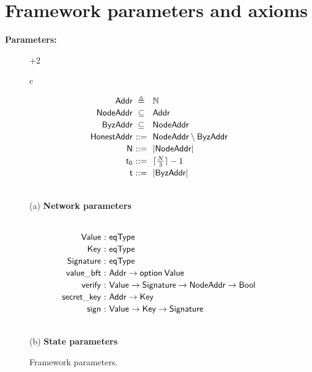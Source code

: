 \documentclass{article}
\begin{document}
\section{Framework parameters and axioms}

\textbf{Parameters:}

{
\begin{figure}[h]
\begin{varwidth}{\dimexpr\textwidth+2\fboxrule\relax}
\centering
{\small{
\begin{tabular}{c}
\begin{minipage}{0.435\linewidth}
{\small{
\[
\begin{array}{r@{\ }c@{\ \ }l}
  \Addr & \eqdef & \Nat \\[2pt]
   \NodeAddr & \subseteq & \Addr \\[2pt]
   \ByzAddr &  \subseteq &  \NodeAddr \\[2pt]
   \mathsf{HonestAddr} & ::= & \NodeAddr \setminus \ByzAddr \\[2pt]
  \N & ::= &  | \NodeAddr | \\[2pt]
  \tZero & ::= & \lceil \frac{N}{3} \rceil - 1 \\[2pt]
  \tN & ::= & | \ByzAddr |
\end{array}
\]
}}
\end{minipage}
\\[3pt]
\small{(a) {\textbf{Network parameters}}}
\\[4pt]
\\[-8pt]
\begin{minipage}{0.43\linewidth}
{\small{
\[
\begin{array}{r@{\ }c@{\ }l}
  \Value & : & \eqType \\[2pt]
  \mathsf{Key} & : & \eqType \\[2pt]
  \mathsf{Signature} & : & \eqType \\[2pt]
  \valuebft & : & \Addr \to \optValue \\[2pt]
  \mathsf{verify} & : & \Value \to \mathsf{Signature} \to \mathsf{NodeAddr} \to \Bool \\[2pt]
  \mathsf{secret\_key} & : & \Addr \to \mathsf{Key} \\[2pt]
  \mathsf{sign} & : & \Value \to \mathsf{Key} \to \mathsf{Signature}
\end{array}
\]
}}
\end{minipage}
\\[3pt]
\small{(b) {\textbf{State parameters}}}
\end{tabular}
}}
\end{varwidth}
\caption{Framework parameters.}
\label{fig:blocks}
\end{figure}
}
\vspace{3mm}
\end{document}

